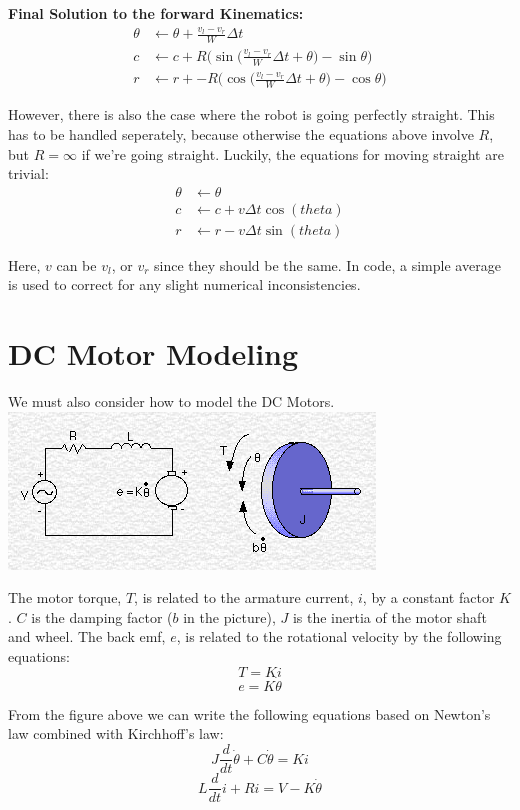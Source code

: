 \documentclass{article}
\begin{document}
\textbf{Final Solution to the forward Kinematics:}
\begin{align}
 \theta &\leftarrow \theta + \frac{v_l-v_r}{W}\Delta t \\
  c &\leftarrow c + R\Bigg(\sin{\Big(\frac{v_l-v_r}{W}\Delta t+\theta\Big)}-\sin{\theta}\Bigg) \\
  r &\leftarrow r + -R\Bigg(\cos{\Big(\frac{v_l-v_r}{W}\Delta t+\theta\Big)}-\cos{\theta}\Bigg)
\end{align}

However, there is also the case where the robot is going perfectly straight. This has to be handled seperately, because otherwise the equations above involve $R$, but $R=\infty$ if we're going straight. Luckily, the equations for moving straight are trivial:
\begin{align}
 \theta &\leftarrow \theta \\
  c &\leftarrow c + v\Delta t\cos(theta) \\
  r &\leftarrow r - v\Delta t\sin(theta)
\end{align}

Here, $v$ can be $v_l$, or $v_r$ since they should be the same. In code, a simple average is used to correct for any slight numerical inconsistencies. \\

\section{DC Motor Modeling}
We must also consider how to model the DC Motors. \\

\includegraphics[scale=0.5]{./dc_motor_model.png}

The motor torque, $T$, is related to the armature current, $i$, by a constant factor $K$. $C$ is the damping factor ($b$ in the picture), $J$ is the inertia of the motor shaft and wheel. The back emf, $e$, is related to the rotational velocity by the following equations:
$$T=Ki$$
$$e=K\dot{\theta}$$

From the figure above we can write the following equations based on Newton's law combined with Kirchhoff's law:
$$J\frac{d}{dt}\dot{\theta} + C\dot{\theta} = Ki$$
$$L\frac{d}{dt}i+Ri=V-K\dot{\theta}$$
\end{document}
